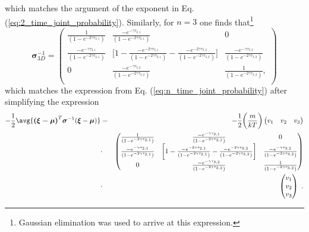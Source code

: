 which matches the argument of the exponent in Eq. (\ref{eq:2_time_joint_probability}). Similarly, for $n=3$ one finds that\footnote{Gaussian elimination was used to arrive at this expression.}
\begin{equation}
\boldsymbol{\sigma}_{3D}^{-1} = \begin{pmatrix}
 \frac{1}{(1-e^{-2 \gamma \tau_{2,1}})} & \frac{-e^{-\gamma	\tau_{2,1}}}{(1-e^{-2 \gamma \tau_{2,1}})} & 0 \\
 \frac{-e^{-\gamma	\tau_{2,1}}}{(1-e^{-2 \gamma \tau_{2,1}})} & \bigg[ 1 - \frac{-e^{-2\gamma	\tau_{2,1}}}{(1-e^{-2 \gamma \tau_{2,1}})} - \frac{-e^{-2\gamma	\tau_{3,2}}}{(1-e^{-2 \gamma \tau_{3,2}})} \bigg] & \frac{-e^{-\gamma	\tau_{3,2}}}{(1-e^{-2 \gamma \tau_{3,2}})} \\
 0 & \frac{-e^{-\gamma	\tau_{3,2}}}{(1-e^{-2 \gamma \tau_{3,2}})} & \frac{1}{(1-e^{-2 \gamma \tau_{3,2}})}, \\
\end{pmatrix}
\end{equation}
which matches the expression from Eq. (\ref{eq:n_time_joint_probability}) after simplifying the expression
\begin{eqnarray}
-\frac{1}{2}\avg{\boldsymbol{(\xi-\boldsymbol{\mu})}^{T} \boldsymbol{\sigma}^{-1} (\boldsymbol{\xi}-\boldsymbol{\mu})} &=& -\frac{1}{2} \bigg( \frac{m}{kT} \bigg) \begin{pmatrix}
 v_1 & v_2 & v_3 \\
\end{pmatrix} \nonumber \\
&\cdot&
 \begin{pmatrix}
 \frac{1}{(1-e^{-2 \gamma \tau_{2,1}})} & \frac{-e^{-\gamma	\tau_{2,1}}}{(1-e^{-2 \gamma \tau_{2,1}})} & 0 \\
 \frac{-e^{-\gamma	\tau_{2,1}}}{(1-e^{-2 \gamma \tau_{2,1}})} & \bigg[ 1 - \frac{-e^{-2\gamma	\tau_{2,1}}}{(1-e^{-2 \gamma \tau_{2,1}})} - \frac{-e^{-2\gamma	\tau_{3,2}}}{(1-e^{-2 \gamma \tau_{3,2}})} \bigg] & \frac{-e^{-\gamma	\tau_{3,2}}}{(1-e^{-2 \gamma \tau_{3,2}})} \nonumber \\
 0 & \frac{-e^{-\gamma	\tau_{3,2}}}{(1-e^{-2 \gamma \tau_{3,2}})} & \frac{1}{(1-e^{-2 \gamma \tau_{3,2}})} \\
\end{pmatrix} \nonumber \\
&\cdot& \begin{pmatrix}
 v_1 \\
 v_2 \\
 v_3 \\
\end{pmatrix}~.
\end{eqnarray}
